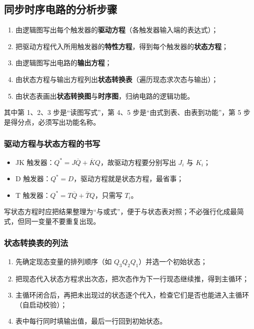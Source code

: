 \subsection{同步时序电路的分析步骤}
\begin{enumerate}
    \item 由逻辑图写出每个触发器的\textbf{驱动方程}（各触发器输入端的表达式）；
    \item 把驱动方程代入所用触发器的\textbf{特性方程}，得到每个触发器的\textbf{状态方程}；
    \item 由逻辑图写出电路的\textbf{输出方程}；
    \item 由状态方程与输出方程列出\textbf{状态转换表}（遍历现态求次态与输出）；
    \item 由状态表画出\textbf{状态转换图}与\textbf{时序图}，归纳电路的逻辑功能。
\end{enumerate}

\noindent 其中第 1、2、3 步是“读图写式”，第 4、5 步是“由式到表、由表到功能”，第 5 步是得分点，必须写出功能名称。

\subsubsection{驱动方程与状态方程的书写}
\begin{itemize}
    \item JK 触发器：$Q^*=J\overline{Q}+\overline{K}Q$，故驱动方程要分别写出 $J_i$ 与 $K_i$；
    \item D 触发器：$Q^*=D$，驱动方程就是状态方程，最省事；
    \item T 触发器：$Q^*=T\overline{Q}+\overline{T}Q$，只需写 $T_i$。
\end{itemize}
写状态方程时应把结果整理为“与或式”，便于与状态表对照；不必强行化成最简式，但同一变量不要重复出现。

\subsubsection{状态转换表的列法}
\begin{enumerate}
    \item 先确定现态变量的排列顺序（如 $Q_3Q_2Q_1$）并选一个初始状态；
    \item 把现态代入状态方程求出次态，把次态作为下一行现态继续推，得到主循环；
    \item 主循环闭合后，再把未出现过的状态逐个代入，检查它们是否也能进入主循环（自启动校验）；
    \item 表中每行同时填输出值，最后一行回到初始状态。
\end{enumerate}


